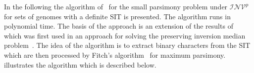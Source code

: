 \documentclass{svmult}
\newcommand{\m}[1]{\mathcal{#1}}
\begin{document}

In the following the algorithm of~\cite{Bernt_2012} for the small parsimony
problem under $\m{INV}^p$ for sets of genomes with a definite SIT is presented.
The algorithm runs in polynomial time. 
The basis of the approach is an extension of the results of~\cite{Berard_2009}
which was first used in an approach for solving the preserving inversion median problem~\cite{Bernt_2008}. 
The idea of the algorithm is to extract binary characters from the SIT which are then processed by Fitch's algorithm~\cite{Fitch_1971} for
maximum parsimony.  
illustrates the algorithm which is described below.
\end{document}
